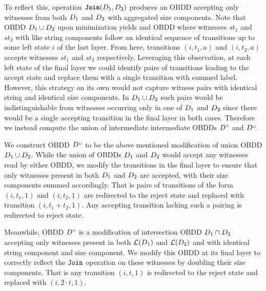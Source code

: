 To reflect this, operation $\texttt{\textbf{Join}}(D_1,D_2) $ produces an OBDD accepting only witnesses from both $D_1$ and $D_2$ with aggregated size components. Note that OBDD $D_1 \cup D_2$ upon minimization yields and OBDD where witnesses $st_1$ and $st_2$ with like string components follow an identical sequence of transitions up to some left state $i$ of the last layer. From here, transitions $(i,t_1,a)$ and $(i,t_2,a)$ accepts witnesses $st_1$ and $st_2$ respectively. Leveraging this observation, at each left state of the final layer we could identify pairs of transitions leading to the accept state and replace them with a single transition with summed label. However, this strategy on its own would not capture witness pairs with identical string and identical size components. In $D_1 \cup D_2$ such pairs would be indistinguishable from witnesses occurring only in one of $D_1$ and $D_2$ since there would be a single accepting transition in the final layer in both cases.
Therefore we instead compute the union of intermediate intermediate OBDDs $D^{{\scriptscriptstyle\cap}}$ and $D^{{\scriptscriptstyle\cup}}$. 

We construct OBDD $D^{{\scriptscriptstyle\cup}}$ to be the above mentioned modification of union OBDD $D_1 \cup D_2$. While the union of OBDDs $D_1$ and $D_2$ would accept any witnesses read by either OBDD, we modify the transitions in the final layer to ensure that only witnesses present in both $D_1$ and $D_2$ are accepted, with their size components summed accordingly. That is pairs of transitions of the form $(i,t_1,1)$ and $(i,t_2,1)$ are redirected to the reject state and replaced with transition $(i,t_1 +t_2,1)$. Any accepting transition lacking such a pairing is redirected to reject state.

Meanwhile, OBDD $D^{{\scriptscriptstyle\cap}}$ is a modification of intersection OBDD $D_1 \cap D_2$ accepting only witnesses present in both $\mathcal{L}(D_1)$ and $\mathcal{L}(D_2)$ and with identical string component and size component. We modify this OBDD at its final layer to correctly reflect the $\texttt{Join}$ operation on these witnesses by doubling their size components. That is any transition $(i,t,1)$ is redirected to the reject state and replaced with $(i,2\cdot t,1)$.



